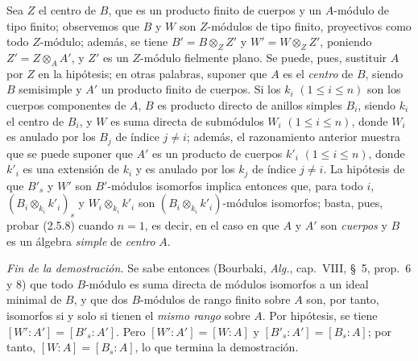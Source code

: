 \begin{env}[2.5.8.8]
Sea $Z$ el centro de $B$, que es un producto finito de cuerpos y un $A$-módulo
de tipo finito; observemos que $B$ y $W$ son $Z$-módulos de tipo finito,
proyectivos como todo $Z$-módulo; además, se tiene
$B'=B\otimes_Z Z'$ y $W'=W\otimes_Z Z'$, poniendo
$Z'=Z\otimes_A A'$, y $Z'$ es un $Z$-módulo fielmente plano. Se puede, pues,
sustituir $A$ por $Z$ en la hipótesis; en otras palabras, suponer que $A$ es el
\emph{centro} de $B$, siendo $B$ semisimple y $A'$ un producto finito de cuerpos. Si
los $k_i$ $(1\leq i\leq n)$ son los cuerpos componentes de $A$, $B$ es producto
directo de anillos simples $B_i$, siendo $k_i$ el centro de $B_i$, y $W$ es
suma directa de submódulos $W_i$ $(1\leq i\leq n)$, donde $W_i$ es anulado por
los $B_j$ de índice $j\ne i$; además, el razonamiento anterior muestra que
se puede suponer que $A'$ es un producto de cuerpos $k'_i$
$(1\leq i\leq n)$, donde $k'_i$ es una extensión de $k_i$ y es anulado por los
$k_j$ de índice $j\ne i$. La hipótesis de que $B'_s$ y $W'$ son $B'$-módulos
isomorfos implica entonces que, para
todo $i$,
$(B_i\otimes_{k_i}k'_i)_s$ y $W_i\otimes_{k_i}k'_i$ son
$(B_i\otimes_{k_i}k'_i)$-módulos isomorfos; basta, pues, probar (2.5.8) cuando
$n=1$, es decir, en el caso en que $A$ y $A'$ son \emph{cuerpos} y $B$ es un álgebra
\emph{simple} de \emph{centro} $A$.
\end{env}

\begin{env}[2.5.8.9]
\label{IV.2.5.8.9-fr}
\emph{Fin de la demostración.} Se sabe entonces (Bourbaki, \emph{Alg.},
cap.~VIII, \S~5, prop.~6 y 8) que todo $B$-módulo es suma directa de módulos
isomorfos a un ideal minimal de $B$, y que dos $B$-módulos de rango finito
sobre $A$ son, por tanto, isomorfos si y solo si tienen el \emph{mismo rango} sobre
$A$. Por hipótesis, se tiene $[W':A']=[B'_s:A']$. Pero
$[W':A']=[W:A]$ y $[B'_s:A']=[B_s:A]$; por tanto, $[W:A]=[B_s:A]$, lo que
termina la demostración.
\end{env}
